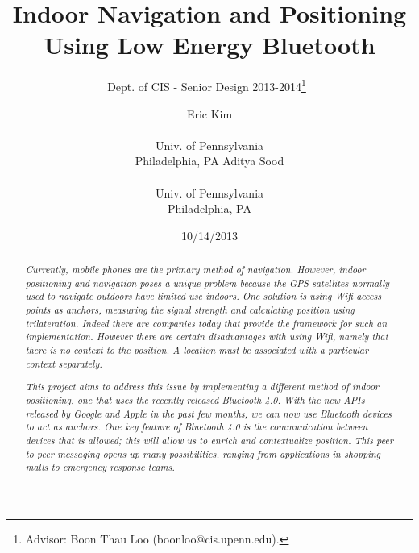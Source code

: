 \documentclass{sig-alternate}
\begin{document}
 

\title{Indoor Navigation and Positioning Using Low Energy Bluetooth}
\subtitle{Dept. of CIS - Senior Design 2013-2014\thanks{Advisor: Boon Thau Loo (boonloo@cis.upenn.edu).}~}
\author{
\alignauthor Eric Kim \\  \\ Univ. of Pennsylvania \\ Philadelphia, PA
\alignauthor  Aditya Sood\\  \\ Univ. of Pennsylvania \\ Philadelphia, PA}
\date{10/14/2013}
\maketitle

\begin{abstract}
  \textit{Currently, mobile phones are the primary method of navigation. 
However, indoor positioning and navigation poses a unique problem 
because the GPS satellites normally used to navigate outdoors have
limited use indoors. One solution is using Wifi access points as anchors,
measuring the signal strength and calculating position using trilateration.
Indeed there are companies today that provide the framework for 
such an implementation. However there are certain disadvantages with
using Wifi, namely that there is no context to the position. A location
must be associated with a particular context separately.
    }

  \textit{This project aims to address this issue by implementing a 
different method of indoor positioning, one that uses the recently
released Bluetooth 4.0. With the new APIs released by Google and
Apple in the past few months, we can now use Bluetooth devices
to act as anchors. One key feature of Bluetooth 4.0 is the communication
between devices that is allowed; this will allow us to enrich and 
contextualize position. This peer to peer messaging opens up many
possibilities, ranging from applications in shopping malls to 
emergency response teams.}
\end{abstract}
\end{document}
